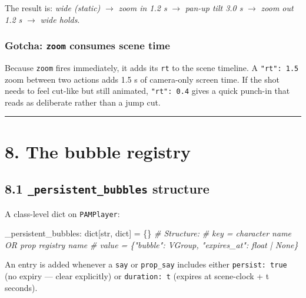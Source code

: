 \documentclass[
  11pt,
]{book}
\newenvironment{Shaded}{}{}
\newcommand{\BuiltInTok}[1]{\textcolor[rgb]{0.00,0.50,0.00}{#1}}
\newcommand{\CommentTok}[1]{\textcolor[rgb]{0.38,0.63,0.69}{\textit{#1}}}
\newcommand{\NormalTok}[1]{#1}
\newcommand{\OperatorTok}[1]{\textcolor[rgb]{0.40,0.40,0.40}{#1}}
\begin{document}
The result is: \emph{wide (static)} $\to$ \emph{zoom in 1.2 s} $\to$
\emph{pan-up tilt 3.0 s} $\to$ \emph{zoom out 1.2 s} $\to$ \emph{wide
holds}.

\subsubsection{Gotcha: \texttt{zoom} consumes scene time}\label{zoom-consumes-time}

Because \texttt{zoom} fires immediately, it adds its \texttt{rt} to the
scene timeline. A \texttt{"rt": 1.5} zoom between two actions adds 1.5 s
of camera-only screen time. If the shot needs to feel
cut-like but still animated, \texttt{"rt": 0.4} gives a quick punch-in
that reads as deliberate rather than a jump cut.

\begin{center}\rule{0.5\linewidth}{0.5pt}\end{center}

\section{8. The bubble registry}\label{the-bubble-registry}

\subsection{\texorpdfstring{8.1 \texttt{\_persistent\_bubbles}
structure}{8.1 \_persistent\_bubbles structure}}\label{persistent_bubbles-structure}

A class-level dict on \texttt{PAMPlayer}:

\begin{Shaded}
\begin{Highlighting}[]
\NormalTok{\_persistent\_bubbles: }\BuiltInTok{dict}\NormalTok{[}\BuiltInTok{str}\NormalTok{, }\BuiltInTok{dict}\NormalTok{] }\OperatorTok{=}\NormalTok{ \{\}}
\CommentTok{\# Structure:}
\CommentTok{\#   key   = character name OR prop registry name}
\CommentTok{\#   value = \{"bubble": VGroup, "expires\_at": float | None\}}
\end{Highlighting}
\end{Shaded}

An entry is added whenever a \texttt{say} or \texttt{prop\_say} includes
either \texttt{persist:\ true} (no expiry --- clear explicitly) or
\texttt{duration:\ t} (expires at scene-clock + t seconds).
\end{document}
